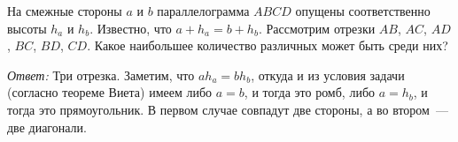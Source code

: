 На смежные стороны $a$ и $b$ параллелограмма $ABCD$ опущены соответственно
высоты $h_a$ и $h_b$.
Известно, что $a + h_a = b + h_b$.
Рассмотрим отрезки $AB$, $AC$, $AD$, $BC$, $BD$, $CD$.
Какое наибольшее количество различных может быть среди них?


\solution
\label{solution:2011/regatta/junior/geomt/4}%
\emph{Ответ:} Три отрезка.
Заметим, что $a h_a = b h_b$, откуда и из условия задачи
(согласно теореме Виета) имеем либо $a = b$, и тогда это ромб, либо $a = h_b$,
и тогда это прямоугольник.
В первом случае совпадут две стороны, а во втором~--- две диагонали.

